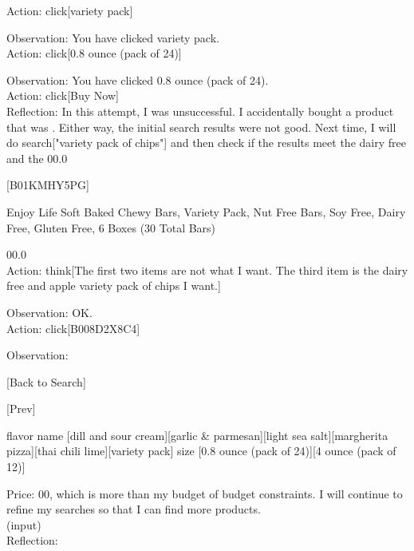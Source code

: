 \documentclass{article} \usepackage{iclr2024_conference,times}
\def\1{\bm{1}}
\begin{document}
Action: click[variety pack]

Observation: You have clicked variety pack.
\\

Action: click[0.8 ounce (pack of 24)]

Observation: You have clicked 0.8 ounce (pack of 24).
\\

Action: click[Buy Now]
\\

Reflection: In this attempt, I was unsuccessful. I accidentally bought a product that was . Either way, the initial search results were not good. Next time, I will do search["variety pack of chips"] and then check if the results meet the dairy free and the \100.0

[B01KMHY5PG]

Enjoy Life Soft Baked Chewy Bars, Variety Pack, Nut Free Bars, Soy Free, Dairy Free, Gluten Free, 6 Boxes (30 Total Bars)

\100.0
\\

Action: think[The first two items are not what I want. The third item is the dairy free and apple variety pack of chips I want.]

Observation: OK.
\\

Action: click[B008D2X8C4]

Observation:

[Back to Search]

[Prev]

flavor name [dill and sour cream][garlic \& parmesan][light sea salt][margherita pizza][thai chili lime][variety pack]
size [0.8 ounce (pack of 24)][4 ounce (pack of 12)]

Price: \100, which is more than my budget of  budget constraints. I will continue to refine my searches so that I can find more products.
\\

(input)
\\

Reflection:













 
\end{document}

